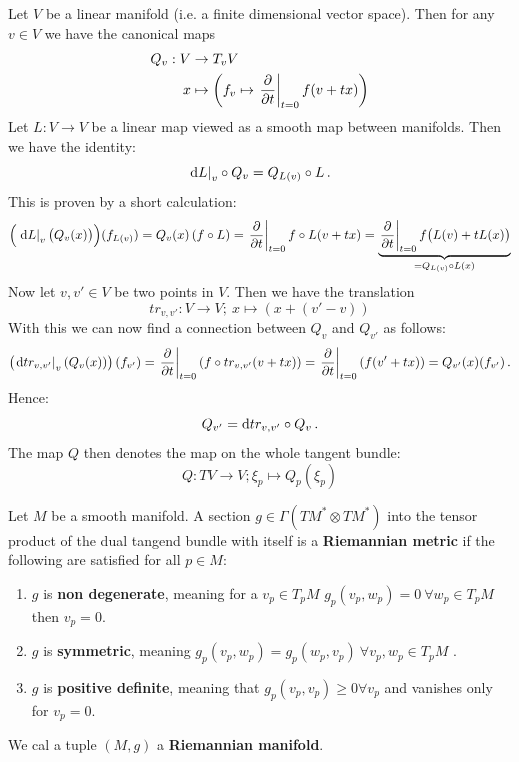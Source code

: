 \begin{definition}
	Let $V$ be a linear manifold (i.e. a finite dimensional vector space). Then for any $v\in V$ we have the canonical maps
	\begin{align*}
		Q_v:V&\to T_vV\,\\
		x&\mapsto \left(f_v\mapsto \left.\frac{\partial }{\partial t}\right|_{t=0}f(v+tx)\right)
	\end{align*}
	Let $L:V\to V$ be a linear map viewed as a smooth map between manifolds. Then we have the identity:
	\begin{equation*}
		\left.\mathop{}\!\mathrm{d} L\right|_{v} \circ Q_v =Q_{L(v)}\circ L\,.
	\end{equation*} This is proven by a short calculation:
	\begin{equation*}
		\Big(\left.\mathop{}\!\mathrm{d} L\right|_{v} \big( Q_v(x)\big)\Big)(f_{L(v)})=Q_{v}(x)\left(f\circ L\right)=\left.\frac{\partial }{\partial t}\right|_{t=0}f\circ L(v+tx)=\underbrace{\left.\frac{\partial }{\partial t}\right|_{t=0}f\big( L(v)+tL(x)\big)}_{=Q_{L(v)}\circ L(x)}
	\end{equation*} Now let $v,v'\in V$ be two points in $V$. Then we have the translation
	\begin{equation*}
		tr_{v,v'}: V\to V;~x\mapsto (x+(v'-v))
	\end{equation*}With this we can now find a connection between $Q_v$ and $Q_{v'}$ as follows:
	\begin{equation*}
		\left(\left.\mathop{}\!\mathrm{d} tr_{v,v'}\right|_{v}(Q_v(x))\right)(f_{v'})=\left.\frac{\partial }{\partial t}\right|_{t=0}\left(f\circ tr_{v,v'}(v+tx)\right)=\left.\frac{\partial }{\partial t}\right|_{t=0}\left(f(v'+tx)\right)=Q_{v'}(x)(f_{v'}) \,.
	\end{equation*} Hence:
	\begin{equation*}
		Q_{v'}=\mathop{}\!\mathrm{d} tr_{v,v'}\circ Q_v\,.
	\end{equation*} 
	The map $Q$ then denotes the map on the whole tangent bundle:
	\begin{equation*}
		Q:TV\to V;\xi_p \mapsto Q_p(\xi_p)
	\end{equation*}
\end{definition}




\begin{definition}[A Metric]
	Let $M$ be a smooth manifold.
	A section $g\in \Gamma(TM^*\otimes TM^*)$ into the tensor product of the dual tangend bundle with itself is a\textbf{ Riemannian metric} if the following are satisfied for all $p\in M$:
	\begin{enumerate}
		\item $g$ is \textbf{non degenerate}, meaning for a $v_p\in T_pM$ $g_p(v_p,w_p)=0 ~\forall w_p\in T_pM$ then $v_p=0$.
		\item $g$ is \textbf{symmetric}, meaning $g_p(v_p,w_p)=g_p(w_p,v_p)~\forall v_p,w_p\in T_pM$ .
		\item $g$ is \textbf{positive definite}, meaning that $g_p(v_p,v_p)\geq 0 \forall v_p$ and vanishes only for $v_p=0$.
	\end{enumerate} We cal a tuple $(M,g)$ a \textbf{Riemannian manifold}.
\end{definition}

